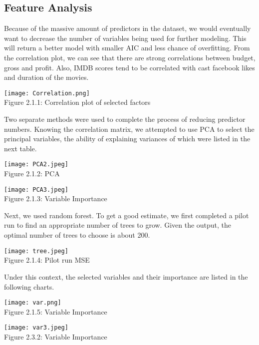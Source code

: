 \documentclass[12pt]{article}
\begin{document}
\begin{multicols}{2}
\subsection{Feature Analysis}
\bigskip
Because of the massive amount of predictors in the dataset, we would eventually want to decrease the number of variables being used for further modeling. This will return a better model with smaller AIC and less chance of overfitting. From the correlation plot, we can see that there are strong correlations between budget, gross and profit. Also, IMDB scores tend to be correlated with cast facebook likes and duration of the movies. \par
\begin{center}
\texttt{[image: Correlation.png]}\\
Figure 2.1.1: Correlation plot of selected factors 
\end{center}
\par
Two separate methods were used to complete the process of reducing predictor numbers. Knowing the correlation matrix, we attempted to use PCA to select the principal variables, the ability of explaining variances of which were listed in the next table. \par
\begin{center}
\texttt{[image: PCA2.jpeg]}\\
Figure 2.1.2: PCA
\end{center}
\begin{center}
\texttt{[image: PCA3.jpeg]}\\
Figure 2.1.3: Variable Importance
\end{center}
\par
Next, we used random forest. To get a good estimate, we first completed a pilot run to find an appropriate number of trees to grow. Given the output, the optimal number of trees to choose is about 200. \par
\begin{center}
\texttt{[image: tree.jpeg]}\\
Figure 2.1.4: Pilot run MSE
\end{center}
\par
Under this context, the selected variables and their importance are listed in the following charts. \par
\begin{center}
\texttt{[image: var.png]}\\
Figure 2.1.5: Variable Importance
\end{center}
\begin{center}
\texttt{[image: var3.jpeg]}\\
Figure 2.3.2: Variable Importance
\end{center}

\end{multicols}
\end{document}
